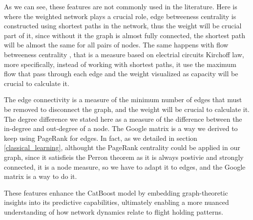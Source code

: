 As we can see, these features are not commonly used in the
literature. Here is where the weighted network plays a crucial role,
edge betweeness centrality \cite{newman2004finding} is constructed
using shortest paths in the network, thus the weight will be crucial
part of it, since without it the graph is almost fully connected, the
shortest path will be almost the same for all pairs of nodes. The same
happens with flow betweeness centrality \cite{freeman1991centrality},
that is a measure based on electrial circuits Kirchoff law, more
specifically, instead of working with shortest paths, it use the
maximum flow that pass through each edge and the weight visualized as
capacity will be crucial to calculate it.

The edge connectivity is a measure of the minimum number of edges that
must be removed to disconnect the graph, and the weight will be
crucial to calculate it. The degree difference we stated here as a
measure of the difference between the in-degree and out-degree of a
node. The Google matrix is a way we derived to keep using PageRank for
edges. In fact, as we detailed in section \ref{classical_learning},
althought the PageRank centrality could be applied in our graph, since
it satisfieis the Perron theorem as it is always postivie and strongly
connected, it is a node measure, so we have to adapt it to edges, and
the Google matrix is a way to do it.

These features enhance the CatBoost model by embedding graph-theoretic
insights into its predictive capabilities, ultimately enabling a more
nuanced understanding of how network dynamics relate to flight holding
patterns.
